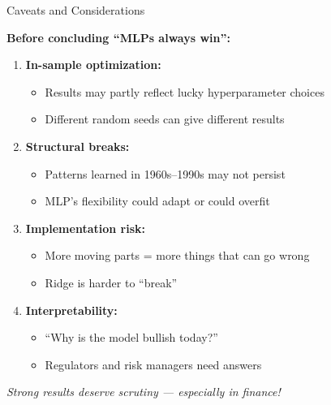 \documentclass[10pt]{beamer}
\begin{document}
\begin{frame}{Caveats and Considerations}

  \textbf{Before concluding ``MLPs always win'':}

  \vspace{0.5em}
  \begin{enumerate}
    \item \textbf{In-sample optimization:}
    \begin{itemize}
      \item Results may partly reflect lucky hyperparameter choices
      \item Different random seeds can give different results
    \end{itemize}

    \vspace{0.3em}
    \item \textbf{Structural breaks:}
    \begin{itemize}
      \item Patterns learned in 1960s--1990s may not persist
      \item MLP's flexibility could adapt or could overfit
    \end{itemize}

    \vspace{0.3em}
    \item \textbf{Implementation risk:}
    \begin{itemize}
      \item More moving parts = more things that can go wrong
      \item Ridge is harder to ``break''
    \end{itemize}

    \vspace{0.3em}
    \item \textbf{Interpretability:}
    \begin{itemize}
      \item ``Why is the model bullish today?''
      \item Regulators and risk managers need answers
    \end{itemize}
  \end{enumerate}

  \vspace{0.5em}
  \textit{Strong results deserve scrutiny --- especially in finance!}
\end{frame}

\end{document}
